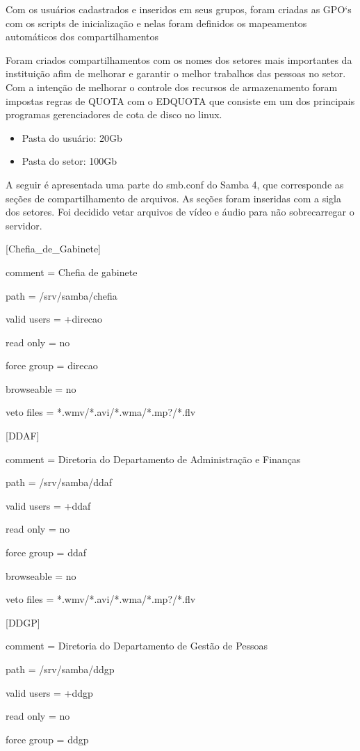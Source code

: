 Com os usuários cadastrados e inseridos em seus grupos, foram criadas as GPO`s com os scripts de inicialização e nelas foram definidos os mapeamentos automáticos dos compartilhamentos

Foram criados compartilhamentos com os nomes dos setores mais importantes da instituição afim de melhorar e garantir o melhor trabalhos das pessoas no setor. Com a intenção de melhorar o controle dos recursos de armazenamento foram impostas regras de QUOTA com o EDQUOTA que consiste em um dos principais programas gerenciadores de cota de disco no linux.

\begin{itemize}
		\item {Pasta do usuário: 20Gb}
		\item {Pasta do setor: 100Gb}
\end{itemize}

A seguir é apresentada uma parte do smb.conf do Samba 4, que corresponde as seções de compartilhamento de arquivos. As seções foram inseridas com a sigla dos setores. Foi decidido vetar arquivos de vídeo e áudio para não sobrecarregar o servidor.

[Chefia\_de\_Gabinete]

comment = Chefia de gabinete

path = /srv/samba/chefia

valid users = +direcao

read only = no

force group = direcao

browseable = no

veto files = *.wmv/*.avi/*.wma/*.mp?/*.flv

[DDAF] 

comment = Diretoria do Departamento de Administração e Finanças

path = /srv/samba/ddaf

valid users = +ddaf

read only = no

force group = ddaf

browseable = no

veto files = *.wmv/*.avi/*.wma/*.mp?/*.flv

[DDGP] 

comment = Diretoria do Departamento de Gestão de Pessoas

path = /srv/samba/ddgp

valid users = +ddgp

read only = no

force group = ddgp

